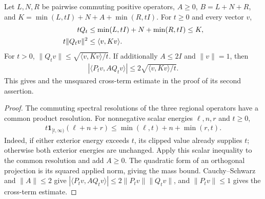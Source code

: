\begin{lemma}
    \label{lem:aklv_clipped_high_mass}
    \leanok
    Let $L,N,R$ be pairwise commuting positive operators, $A\ge0$,
    $B=L+N+R$, and $K=\min(L,tI)+N+A+\min(R,tI)$.
    For $t\ge0$ and every vector $v$,
    \begin{align}
        tQ_t        & \le\min(L,tI)+N+\min(R,tI)\le K,\notag \\
        t\|Q_tv\|^2 & \le\langle v,Kv\rangle.
    \end{align}
    For $t>0$, $\|Q_tv\|\le\sqrt{\langle v,Kv\rangle/t}$.
    If additionally $A\le2I$ and $\|v\|=1$, then
    \begin{align}
        |\langle P_tv,AQ_tv\rangle|
        \le2\sqrt{\langle v,Kv\rangle/t}.
    \end{align}
    This gives \cite[Lemma~6.5(1)]{Arad2013AreaLaw} and the unsquared
    cross-term estimate in the proof of its second assertion.
\end{lemma}
\begin{proof}\leanok
    The commuting spectral resolutions of the three regional operators
    have a common product resolution. For nonnegative scalar energies
    $\ell,n,r$ and $t\ge0$,
    \begin{align}
        t\mathbf1_{[t,\infty)}(\ell+n+r)
        \le\min(\ell,t)+n+\min(r,t).
    \end{align}
    Indeed, if either exterior energy exceeds $t$, its clipped value
    already supplies $t$; otherwise both exterior energies are unchanged.
    Apply this scalar inequality to the common resolution and add $A\ge0$.
    The quadratic form of an orthogonal projection is its squared applied
    norm, giving the mass bound. Cauchy--Schwarz and $\|A\|\le2$ give
    $|\langle P_tv,AQ_tv\rangle|\le2\|P_tv\|\|Q_tv\|$, and
    $\|P_tv\|\le1$ gives the cross-term estimate.
\end{proof}

